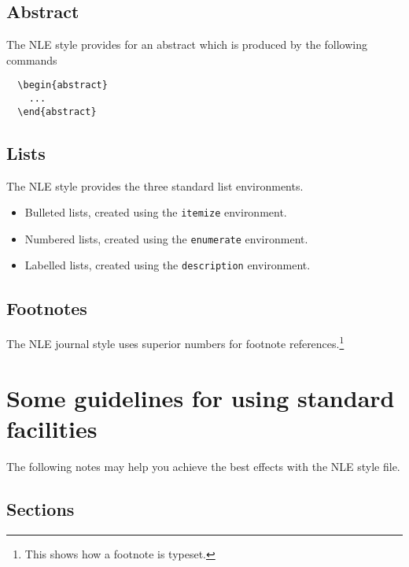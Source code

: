\documentclass{cnle}
\begin{document}
\subsection{Abstract}

The NLE style provides for an abstract which is produced by the following
commands
%
\begin{verbatim}
  \begin{abstract}
    ...
  \end{abstract}
\end{verbatim}

\subsection{Lists}

The NLE style provides the three standard list environments.
\begin{itemize}
  \item Bulleted lists, created using the \verb"itemize" environment.
  \item Numbered lists, created using the \verb"enumerate" environment.
  \item Labelled lists, created using the \verb"description" environment.
\end{itemize}

\subsection{Footnotes}

The NLE journal style uses superior numbers for footnote
references.\footnote{This shows how a footnote is typeset.}

\section{Some guidelines for using standard facilities}

The following notes may help you achieve the best effects with the NLE style
file.

\subsection{Sections}
\end{document}
